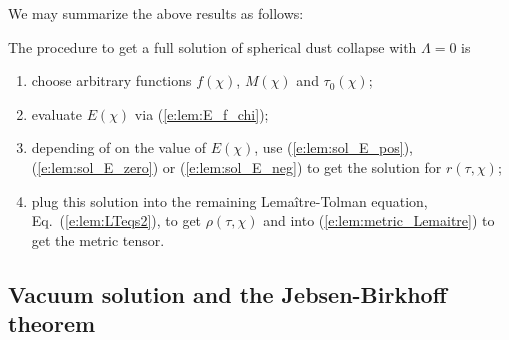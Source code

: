 We may summarize the above results as follows:
\begin{prop}
The procedure to get a full solution of spherical dust collapse with $\Lambda=0$ is
\begin{enumerate}
\item choose arbitrary functions
$f(\chi)$, $M(\chi)$ and $\tau_0(\chi)$;
\item evaluate $E(\chi)$ via (\ref{e:lem:E_f_chi});
\item depending of
on the value of $E(\chi)$, use (\ref{e:lem:sol_E_pos}), (\ref{e:lem:sol_E_zero})
or (\ref{e:lem:sol_E_neg}) to get the solution for $r(\tau,\chi)$;
\item plug this solution into the remaining Lemaître-Tolman equation,
Eq.~(\ref{e:lem:LTeqs2}), to get $\rho(\tau,\chi)$ and into
(\ref{e:lem:metric_Lemaitre}) to get the metric tensor.
\end{enumerate}
\end{prop}

\subsection{Vacuum solution and the Jebsen-Birkhoff theorem} \label{s:lem:Birkhoff}

